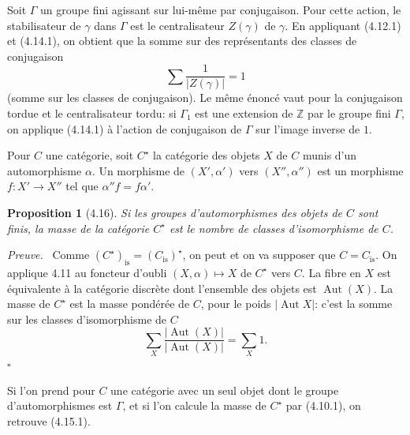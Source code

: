 \documentclass[10pt]{article}
\newcommand{\Aut}{\operatorname{Aut}}
\theoremstyle{deligne}
\newtheorem*{proposition*}{Proposition}
\newenvironment{proofdel}[1][Preuve.]{\textit{#1}\ }{\hfill$\square$}
\newcommand{\heading}[1]{\vspace{0.7em}\noindent{\bfseries #1}\quad}
\begin{document}
\heading{Exemple 4.15.} Soit $\Gamma$ un groupe fini agissant sur lui-même par conjugaison. Pour cette action, le stabilisateur de $\gamma$ dans $\Gamma$ est le centralisateur $Z(\gamma)$ de $\gamma$. En appliquant (4.12.1) et (4.14.1), on obtient que la somme sur des représentants des classes de conjugaison
\begin{equation}\tag{4.15.1}
\sum \frac1{|Z(\gamma)|}=1
\end{equation}
(somme sur les classes de conjugaison). Le même énoncé vaut pour la conjugaison tordue et le centralisateur tordu: si $\Gamma_1$ est une extension de $\mathbb Z$ par le groupe fini $\Gamma$, on applique (4.14.1) à l'action de conjugaison de $\Gamma$ sur l'image inverse de $1$.

Pour $C$ une catégorie, soit $C^\star$ la catégorie des objets $X$ de $C$ munis d'un automorphisme $\alpha$. Un morphisme de $(X',\alpha')$ vers $(X'',\alpha'')$ est un morphisme $f:X'\to X''$ tel que $\alpha''f=f\alpha'$.

\begin{proposition*}[4.16]
Si les groupes d'automorphismes des objets de $C$ sont finis, la masse de la catégorie $C^\star$ est le nombre de classes d'isomorphisme de $C$.
\end{proposition*}

\begin{proofdel}[Preuve.]
Comme $(C^\star)_{\mathrm{is}}=(C_{\mathrm{is}})^\star$, on peut et on va supposer que $C=C_{\mathrm{is}}$. On applique 4.11 au foncteur d'oubli $(X,\alpha)\mapsto X$ de $C^\star$ vers $C$. La fibre en $X$ est équivalente à la catégorie discrète dont l'ensemble des objets est $\Aut(X)$. La masse de $C^\star$ est la masse pondérée de $C$, pour le poids $|\Aut X|$: c'est la somme sur les classes d'isomorphisme de $C$
\[
\sum_X \frac{|\Aut(X)|}{|\Aut(X)|}=\sum_X 1.
\]
\end{proofdel}

Si l'on prend pour $C$ une catégorie avec un seul objet dont le groupe d'automorphismes est $\Gamma$, et si l'on calcule la masse de $C^\star$ par (4.10.1), on retrouve (4.15.1).
\end{document}

